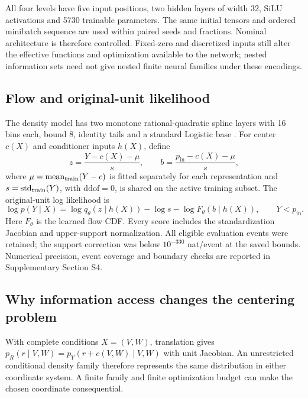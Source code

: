 \documentclass[11pt]{article}
\newcommand{\pin}{p_{\mathrm{in}}}
\begin{document}
All four levels have five input positions, two hidden layers of width 32,
SiLU activations and 5730 trainable parameters. The same initial tensors and
ordered minibatch sequence are used within paired seeds and fractions.
Nominal architecture is therefore controlled. Fixed-zero and discretized
inputs still alter the effective functions and optimization available to the
network; nested information sets need not give nested finite neural families
under these encodings.

\subsection{Flow and original-unit likelihood}

The density model has two monotone rational-quadratic spline layers with
16 bins each, bound 8, identity tails and a standard Logistic base
\citep{DurkanEtAl2019}. For center $c(X)$ and conditioner inputs $h(X)$,
define
\begin{equation}
 z=\frac{Y-c(X)-\mu}{s},\qquad b=\frac{\pin-c(X)-\mu}{s},
\end{equation}
where $\mu=\operatorname{mean}_{\rm train}(Y-c)$ is fitted separately for
each representation and $s=\operatorname{std}_{\rm train}(Y)$, with
$\mathrm{ddof}=0$, is shared on the active training subset. The original-unit
log likelihood is
\begin{equation}
 \log p(Y\mid X)=\log q_\theta(z\mid h(X))-\log s
                   -\log F_\theta(b\mid h(X)),\qquad Y<\pin.
 \label{eq:likelihood}
\end{equation}
Here $F_\theta$ is the learned flow CDF. Every score includes the
standardization Jacobian and upper-support normalization. All eligible
evaluation events were retained; the support correction was below
$10^{-330}$ nat/event at the saved bounds. Numerical precision, event coverage
and boundary checks are reported in Supplementary Section S4.

\subsection{Why information access changes the centering problem}

With complete conditions $X=(V,W)$, translation gives
$p_R(r\mid V,W)=p_Y(r+c(V,W)\mid V,W)$ with unit Jacobian. An unrestricted
conditional density family therefore represents the same distribution in
either coordinate system. A finite family and finite optimization budget
can make the chosen coordinate consequential.
\end{document}
